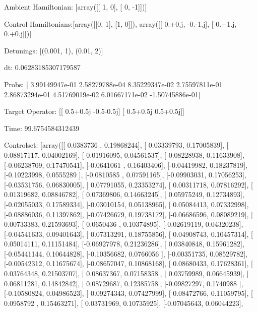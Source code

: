 \documentclass{article}
\begin{document}
    

\newpage

Ambient Hamiltonian: [array([[ 1,  0],
       [ 0, -1]])]

Control Hamiltonians:[array([[0, 1],
       [1, 0]]), array([[ 0.+0.j, -0.-1.j],
       [ 0.+1.j,  0.+0.j]])]

Detunings: [(0.001, 1), (0.01, 2)]

 dt: 0.06283185307179587

Probs: [  3.99149947e-01   2.58279788e-04   8.35229347e-02   2.75597811e-01
   2.86873294e-01   4.51769019e-02   6.01667171e-02  -1.50745886e-01]

Target Operator: [[ 0.5+0.5j -0.5-0.5j]
 [ 0.5+0.5j  0.5+0.5j]]

Time: 99.6754584312439

Controlset: [array([[ 0.0383736 ,  0.19868244],
       [ 0.03339793,  0.17005839],
       [ 0.08817117,  0.04002169],
       [-0.01916095,  0.04561537],
       [-0.08228938,  0.11633908],
       [-0.06238709,  0.17470541],
       [-0.0641061 ,  0.16403406],
       [-0.04419982,  0.18237819],
       [-0.10223998,  0.0555289 ],
       [-0.0810585 ,  0.07591165],
       [-0.09903031,  0.17056253],
       [-0.03531756,  0.06830005],
       [ 0.07791055,  0.23353274],
       [ 0.00311718,  0.07816292],
       [ 0.01319682,  0.08846782],
       [ 0.07369806,  0.14663245],
       [ 0.05975249,  0.12734893],
       [-0.02055033,  0.17589334],
       [-0.03010154,  0.05138965],
       [ 0.05084413,  0.07332998],
       [-0.08886036,  0.11397862],
       [-0.07426679,  0.19738172],
       [-0.06686596,  0.08089219],
       [ 0.00733383,  0.21593693],
       [ 0.0650436 ,  0.10374895],
       [-0.02619119,  0.04320238],
       [-0.04541633,  0.09401643],
       [ 0.07313291,  0.18755856],
       [ 0.04908743,  0.10457314],
       [ 0.05014111,  0.11151484],
       [-0.06927978,  0.21236286],
       [ 0.03840848,  0.15961282],
       [-0.05441144,  0.10644828],
       [-0.10356682,  0.0766056 ],
       [-0.00351735,  0.08529782],
       [-0.00542312,  0.11675674],
       [-0.08657047,  0.10868168],
       [ 0.08680433,  0.17628361],
       [ 0.03764348,  0.21503707],
       [ 0.08637367,  0.07158358],
       [ 0.03759989,  0.06645939],
       [ 0.06811281,  0.14842842],
       [ 0.08729687,  0.12385758],
       [-0.09827297,  0.1740988 ],
       [-0.10580824,  0.04986523],
       [ 0.09274343,  0.07427999],
       [ 0.08472766,  0.11059795],
       [ 0.0958792 ,  0.15463271],
       [ 0.03731969,  0.10735925],
       [-0.07045643,  0.06044223],
\end{document}
